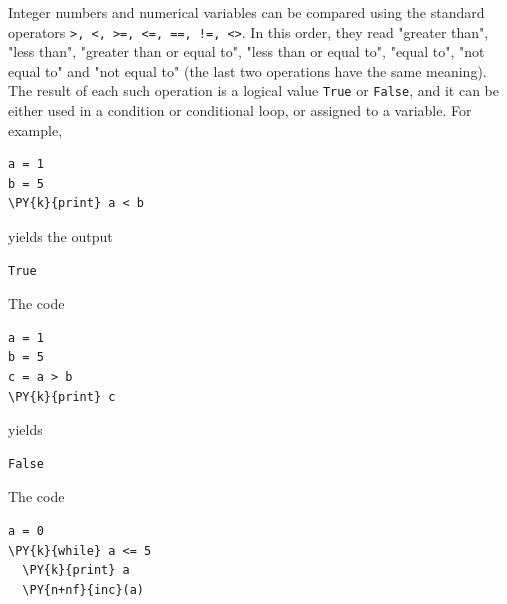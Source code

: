 Integer numbers and numerical variables can be compared using the 
standard operators {\tt >, <, >=, <=, ==, !=, <>}. In this order, 
they read "greater than", "less than", "greater than or equal to", 
"less than or equal to", "equal to", "not equal to" and "not equal to"
(the last two operations have the same meaning). The result of each such 
operation is a logical value {\tt True} or {\tt False}, and it can be 
either used in a condition or conditional loop, or assigned to 
a variable. For example,\\

\begin{bbox}
\begin{Verbatim}[commandchars=\\\{\}]
a = 1
b = 5
\PY{k}{print} a < b
\end{Verbatim}
\end{bbox}
\vspace{6mm}

\noindent
yields the output\\

\begin{ybox}
\begin{Verbatim}[commandchars=\\\{\}]
True
\end{Verbatim}
\end{ybox}
\vspace{6mm}

\noindent
The code\\

\begin{bbox}
\begin{Verbatim}[commandchars=\\\{\}]
a = 1
b = 5
c = a > b
\PY{k}{print} c
\end{Verbatim}
\end{bbox}
\vspace{6mm}

\noindent
yields\\

\begin{ybox}
\begin{Verbatim}[commandchars=\\\{\}]
False
\end{Verbatim}
\end{ybox}
\vspace{6mm}

\noindent
The code \\

\begin{bbox}
\begin{Verbatim}[commandchars=\\\{\}]
a = 0
\PY{k}{while} a <= 5
  \PY{k}{print} a 
  \PY{n+nf}{inc}(a)
\end{Verbatim}
\end{bbox}
\vspace{6mm}

